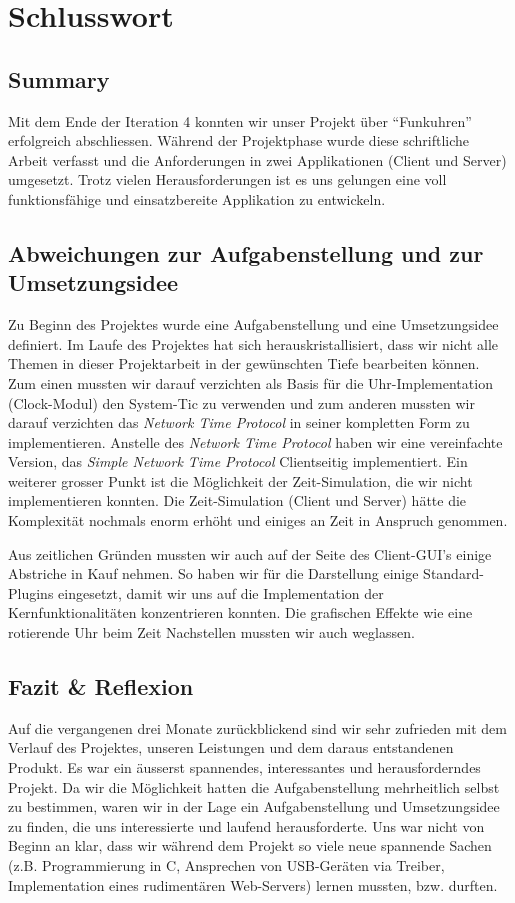 
\chapter{Schlusswort}
\label{chap:Schlusswort}

\section{Summary}
Mit dem Ende der Iteration 4 konnten wir unser Projekt über "`Funkuhren"' erfolgreich abschliessen. Während der Projektphase wurde diese schriftliche Arbeit verfasst und die Anforderungen in zwei Applikationen (Client und Server) umgesetzt. Trotz vielen Herausforderungen ist es uns gelungen eine voll funktionsfähige und einsatzbereite Applikation zu entwickeln.

\section{Abweichungen zur Aufgabenstellung und zur Umsetzungsidee}
Zu Beginn des Projektes wurde eine Aufgabenstellung und eine Umsetzungsidee definiert. Im Laufe des Projektes hat sich herauskristallisiert, dass wir nicht alle Themen in dieser Projektarbeit in der gewünschten Tiefe bearbeiten können. Zum einen mussten wir darauf verzichten als Basis für die Uhr-Implementation (Clock-Modul) den System-Tic zu verwenden und zum anderen mussten wir darauf verzichten das \textit{Network Time Protocol} in seiner kompletten Form zu implementieren. Anstelle des \textit{Network Time Protocol} haben wir eine vereinfachte Version, das \textit{Simple Network Time Protocol} Clientseitig implementiert. Ein weiterer grosser Punkt ist die Möglichkeit der Zeit-Simulation, die wir nicht implementieren konnten. Die Zeit-Simulation (Client und Server) hätte die Komplexität nochmals enorm erhöht und einiges an Zeit in Anspruch genommen.

Aus zeitlichen Gründen mussten wir auch auf der Seite des Client-GUI's einige Abstriche in Kauf nehmen. So haben wir für die Darstellung einige Standard-Plugins eingesetzt, damit wir uns auf die Implementation der Kernfunktionalitäten konzentrieren konnten. Die grafischen Effekte wie eine rotierende Uhr beim Zeit Nachstellen mussten wir auch weglassen.


\section{Fazit \& Reflexion}
Auf die vergangenen drei Monate zurückblickend sind wir sehr zufrieden mit dem Verlauf des Projektes, unseren Leistungen und dem daraus entstandenen Produkt. Es war ein äusserst spannendes, interessantes und herausforderndes Projekt. Da wir die Möglichkeit hatten die Aufgabenstellung mehrheitlich selbst zu bestimmen, waren wir in der Lage ein Aufgabenstellung und Umsetzungsidee zu finden, die uns interessierte und laufend herausforderte. Uns war nicht von Beginn an klar, dass wir während dem Projekt so viele neue spannende Sachen (z.B. Programmierung in C, Ansprechen von USB-Geräten via Treiber, Implementation eines rudimentären Web-Servers) lernen mussten, bzw. durften.

